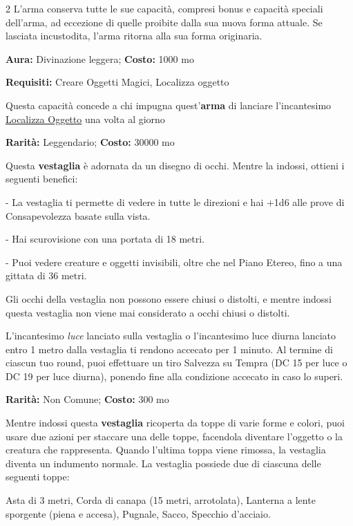 \begin{multicols}{2}
L'arma conserva tutte le sue capacità, compresi bonus e capacità speciali dell'arma, ad eccezione di quelle proibite dalla sua nuova forma attuale. Se lasciata incustodita, l'arma ritorna alla sua forma originaria.


\textbf{Aura:} Divinazione leggera; \textbf{Costo:} 1000 mo

\textbf{Requisiti:} Creare Oggetti Magici, Localizza oggetto

Questa capacità concede a chi impugna quest'\textbf{arma} di lanciare l'incantesimo \hyperlink{Localizza Oggetto}{Localizza Oggetto} una volta al giorno


\textbf{Rarità:} Leggendario; \textbf{Costo:} 30000 mo

Questa \textbf{vestaglia} è adornata da un disegno di occhi. Mentre la indossi, ottieni i seguenti benefici:

- La vestaglia ti permette di vedere in tutte le direzioni e hai +1d6 alle prove di Consapevolezza basate sulla vista.

- Hai scurovisione con una portata di 18 metri.

- Puoi vedere creature e oggetti invisibili, oltre che nel Piano Etereo, fino a una gittata di 36 metri.

Gli occhi della vestaglia non possono essere chiusi o distolti, e mentre indossi questa vestaglia non viene mai considerato a occhi chiusi o distolti.

L'incantesimo \emph{luce} lanciato sulla vestaglia o l'incantesimo luce diurna lanciato entro 1 metro dalla vestaglia ti rendono accecato per 1 minuto. Al termine di ciascun tuo round, puoi effettuare un tiro Salvezza su Tempra (DC 15 per luce o DC 19 per luce diurna), ponendo fine alla condizione accecato in caso lo superi.


\textbf{Rarità:} Non Comune; \textbf{Costo:} 300 mo

Mentre indossi questa \textbf{vestaglia} ricoperta da toppe di varie forme e colori, puoi usare due azioni per staccare una delle toppe, facendola diventare l'oggetto o la creatura che rappresenta. Quando l'ultima toppa viene rimossa, la vestaglia diventa un indumento normale. La vestaglia possiede due di ciascuna delle seguenti toppe:

Asta di 3 metri, Corda di canapa (15 metri, arrotolata), Lanterna a lente sporgente (piena e accesa), Pugnale, Sacco, Specchio d'acciaio.


\end{multicols}
